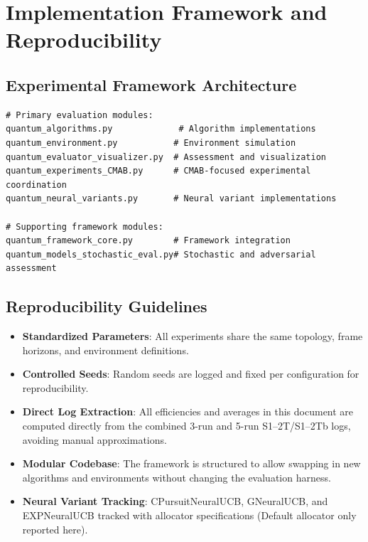 \documentclass[12pt,a4paper]{article}
\begin{document}
\section{Implementation Framework and Reproducibility}

\subsection{Experimental Framework Architecture}

\begin{lstlisting}[caption=Core Framework Components]
# Primary evaluation modules:
quantum_algorithms.py             # Algorithm implementations
quantum_environment.py           # Environment simulation
quantum_evaluator_visualizer.py  # Assessment and visualization
quantum_experiments_CMAB.py      # CMAB-focused experimental coordination
quantum_neural_variants.py       # Neural variant implementations

# Supporting framework modules:
quantum_framework_core.py        # Framework integration
quantum_models_stochastic_eval.py# Stochastic and adversarial assessment
\end{lstlisting}

\subsection{Reproducibility Guidelines}

\begin{itemize}
\item \textbf{Standardized Parameters}: All experiments share the same topology, frame horizons, and environment definitions.
\item \textbf{Controlled Seeds}: Random seeds are logged and fixed per configuration for reproducibility.
\item \textbf{Direct Log Extraction}: All efficiencies and averages in this document are computed directly from the combined 3-run and 5-run S1–2T/S1–2Tb logs, avoiding manual approximations.
\item \textbf{Modular Codebase}: The framework is structured to allow swapping in new algorithms and environments without changing the evaluation harness.
\item \textbf{Neural Variant Tracking}: CPursuitNeuralUCB, GNeuralUCB, and EXPNeuralUCB tracked with allocator specifications (Default allocator only reported here).
\end{itemize}

\newpage
\end{document}

